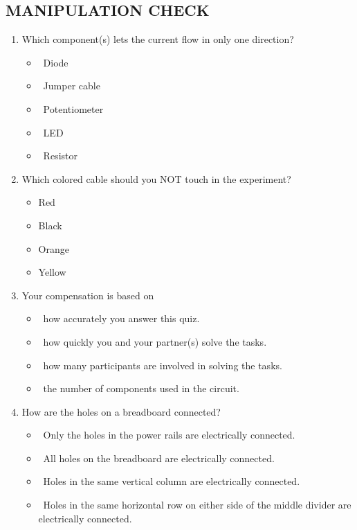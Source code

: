 \documentclass[msom,nonblindrev]{01 latex/class/informs3}
\begin{document}
\begin{APPENDICES}
\SingleSpacedXI
\section{MANIPULATION CHECK}\label{app:manipulation}
\begin{enumerate}
 \item Which component(s) lets the current flow in only one direction?
  \begin{itemize}
    \item \checkbox\ Diode
    \item \checkbox\ Jumper cable
    \item \checkbox\ Potentiometer
    \item \checkbox\ LED
    \item \checkbox\ Resistor
  \end{itemize}

 \item Which colored cable should you NOT touch in the experiment?
  \begin{itemize}
    \item \radiobutton Red
    \item \radiobutton Black
    \item \radiobutton Orange
    \item \radiobutton Yellow
   \end{itemize}

  \item Your compensation is based on
   \begin{itemize}
    \item \radiobutton\ how accurately you answer this quiz.
    \item \radiobutton\ how quickly you and your partner(s) solve the tasks.
    \item \radiobutton\ how many participants are involved in solving the tasks.
    \item \radiobutton\ the number of components used in the circuit.
   \end{itemize}

  \item How are the holes on a breadboard connected?
   \begin{itemize}
    \item \radiobutton\ Only the holes in the power rails are electrically connected.
    \item \radiobutton\ All holes on the breadboard are electrically connected.
    \item \radiobutton\ Holes in the same vertical column are electrically connected.
    \item \radiobutton\ Holes in the same horizontal row on either side of the middle divider are electrically connected.
   \end{itemize}


\end{enumerate}
\end{APPENDICES}
\end{document}
